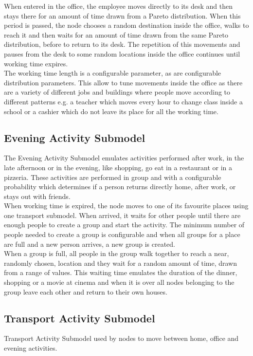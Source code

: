 When entered in the office, the employee moves directly to its desk and then stays there for an amount of time drawn from a Pareto distribution. When this period is passed, the node chooses a random destination inside the office, walks to reach it and then waits for an amount of time drawn from the same Pareto distribution, before to return to its desk. The repetition of this movements and pauses from the desk to some random locations inside the office continues until working time expires. 
\\

The working time length is a configurable parameter, as are configurable distribution parameters. This allow to tune movements inside the office as there are a variety of different jobs and buildings where people move according to different patterns e.g. a teacher which moves every hour to change class inside a school or a cashier which do not leave its place for all the working time.


\subsection{Evening Activity Submodel}
The Evening Activity Submodel emulates activities performed after work, in the late afternoon or in the evening, like shopping, go eat in a restaurant or in a pizzeria. These activities are performed in group and with a configurable probability which determines if a person returns directly home, after work, or stays out with friends.
\\

When working time is expired, the node moves to one of its favourite places using one transport submodel. When arrived, it waits for other people until there are enough people to create a group and start the activity. The minimum number of people needed to create a group is configurable and when all groups for a place are full and a new person arrives, a new group is created.
\\

When a group is full, all people in the group walk together to reach a near, randomly chosen, location and they wait for a random amount of time, drawn from a range of values. This waiting time emulates the duration of the dinner, shopping or a movie at cinema and when it is over all nodes belonging to the group leave each other and return to their own houses.

\subsection{Transport Activity Submodel}
Transport Activity Submodel used by nodes to move between home, office and evening activities.
\\

